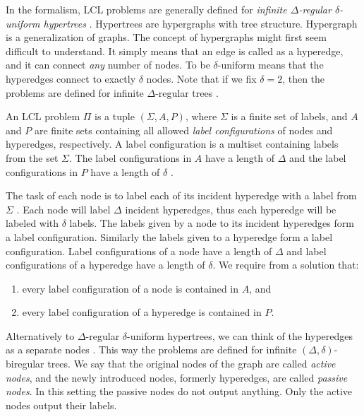 In the formalism, LCL problems are generally defined for \emph{infinite $\Delta$-regular $\delta$-uniform hypertrees} \cite{DBLP:conf/podc/Olivetti20}.
Hypertrees are hypergraphs with tree structure.
Hypergraph is a generalization of graphs.
The concept of hypergraphs might first seem difficult to understand.
It simply means that an edge is called as a hyperedge, and it can connect \emph{any} number of nodes.
To be $\delta$-uniform means that the hyperedges connect to exactly $\delta$ nodes.
Note that if we fix $\delta=2$, then the problems are defined for infinite $\Delta$-regular trees \cite{DBLP:conf/podc/Olivetti20}.

An LCL problem $\Pi$ is a tuple $(\Sigma, A, P)$, where $\Sigma$ is a finite set of labels, and $A$ and $P$ are finite sets containing all allowed \emph{label configurations} of nodes and hyperedges, respectively.
A label configuration is a multiset containing labels from the set $\Sigma$.
The label configurations in $A$ have a length of $\Delta$ and the label configurations in $P$ have a length of $\delta$ \cite{DBLP:journals/sigact/Suomela20}.

The task of each node is to label each of its incident hyperedge with a label from $\Sigma$ \cite{DBLP:journals/sigact/Suomela20}.
Each node will label $\Delta$ incident hyperedges, thus each hyperedge will be labeled with $\delta$ labels.
The labels given by a node to its incident hyperedges form a label configuration.
Similarly the labels given to a hyperedge form a label configuration.
Label configurations of a node have a length of $\Delta$ and label configurations of a hyperedge have a length of $\delta$.
We require from a solution that:
\begin{enumerate}
  \item every label configuration of a node is contained in $A$, and
  \item every label configuration of a hyperedge is contained in $P$.
\end{enumerate}

Alternatively to $\Delta$-regular $\delta$-uniform hypertrees, we can think of the hyperedges as a separate nodes \cite{DBLP:conf/podc/Olivetti20}.
This way the problems are defined for infinite $(\Delta, \delta)$-biregular trees.
We say that the original nodes of the graph are called \emph{active nodes}, and the newly introduced nodes, formerly hyperedges, are called \emph{passive nodes}.
In this setting the passive nodes do not output anything.
Only the active nodes output their labels.

